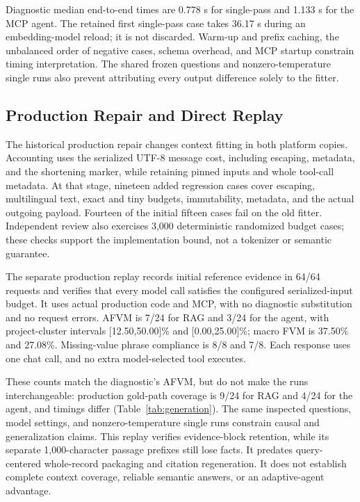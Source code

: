 \documentclass[conference,letterpaper]{IEEEtran}
\begin{document}
Diagnostic median end-to-end times are 0.778 s for single-pass and 1.133 s for the MCP agent. The retained first single-pass case takes 36.17 s during an embedding-model reload; it is not discarded. Warm-up and prefix caching, the unbalanced order of negative cases, schema overhead, and MCP startup constrain timing interpretation. The shared frozen questions and nonzero-temperature single runs also prevent attributing every output difference solely to the fitter.

\subsection{Production Repair and Direct Replay}
The historical production repair changes context fitting in both platform copies. Accounting uses the serialized UTF-8 message cost, including escaping, metadata, and the shortening marker, while retaining pinned inputs and whole tool-call metadata. At that stage, nineteen added regression cases cover escaping, multilingual text, exact and tiny budgets, immutability, metadata, and the actual outgoing payload. Fourteen of the initial fifteen cases fail on the old fitter. Independent review also exercises 3,000 deterministic randomized budget cases; these checks support the implementation bound, not a tokenizer or semantic guarantee.

The separate production replay records initial reference evidence in 64/64 requests and verifies that every model call satisfies the configured serialized-input budget. It uses actual production code and MCP, with no diagnostic substitution and no request errors. AFVM is 7/24 for RAG and 3/24 for the agent, with project-cluster intervals [12.50,50.00]\% and [0.00,25.00]\%; macro FVM is 37.50\% and 27.08\%. Missing-value phrase compliance is 8/8 and 7/8. Each response uses one chat call, and no extra model-selected tool executes.

These counts match the diagnostic's AFVM, but do not make the runs interchangeable: production gold-path coverage is 9/24 for RAG and 4/24 for the agent, and timings differ (Table~\ref{tab:generation}). The same inspected questions, model settings, and nonzero-temperature single runs constrain causal and generalization claims. This replay verifies evidence-block retention, while its separate 1,000-character passage prefixes still lose facts. It predates query-centered whole-record packaging and citation regeneration. It does not establish complete context coverage, reliable semantic answers, or an adaptive-agent advantage.
\end{document}

